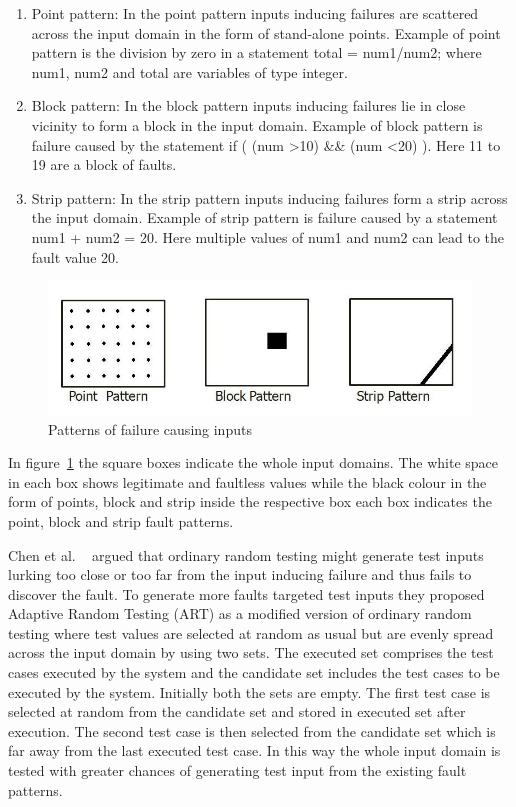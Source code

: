 \begin{enumerate}
\item Point pattern: In the point pattern inputs inducing failures are scattered across the input domain in the form of stand-alone points. Example of point pattern is the division by zero in a statement total = num1/num2; where num1, num2 and total are variables of type integer.
\item Block pattern: In the block pattern inputs inducing failures lie in close vicinity to form a block in the input domain. Example of block pattern is failure caused by the statement if ( (num \textgreater 10) \&\& (num \textless 20) ). Here 11 to 19 are a block of faults.
\item Strip pattern: In the strip pattern inputs inducing failures form a strip across the input domain. Example of strip pattern is failure caused by a statement num1 + num2 = 20. Here multiple values of num1 and num2 can lead to the fault value 20. 
\end{enumerate}

\begin{figure}[h]
	\centering
	\includegraphics[scale=0.5]{Literature/pointblockstrip.jpg}
	\caption{Patterns of failure causing inputs}
	\label{fig:patterns2}
\end{figure}

In figure~\ref{fig:patterns2} the square boxes indicate the whole input domains. The white space in each box shows legitimate and faultless values while the black colour in the form of points, block and strip inside the respective box each box indicates the point, block and strip fault patterns.

Chen et al. ~\cite{Chen2008} argued that ordinary random testing might generate test inputs lurking too close or too far from the input inducing failure and thus fails to discover the fault. To generate more faults targeted test inputs they proposed Adaptive Random Testing (ART) as a modified version of ordinary random testing where test values are selected at random as usual but are evenly spread across the input domain by using two sets. The executed set comprises the test cases executed by the system and the candidate set includes the test cases to be executed by the system. Initially both the sets are empty. The first test case is selected at random from the candidate set and stored in executed set after execution. The second test case is then selected from the candidate set which is far away from the last executed test case. In this way the whole input domain is tested with greater chances of generating test input from the existing fault patterns.

